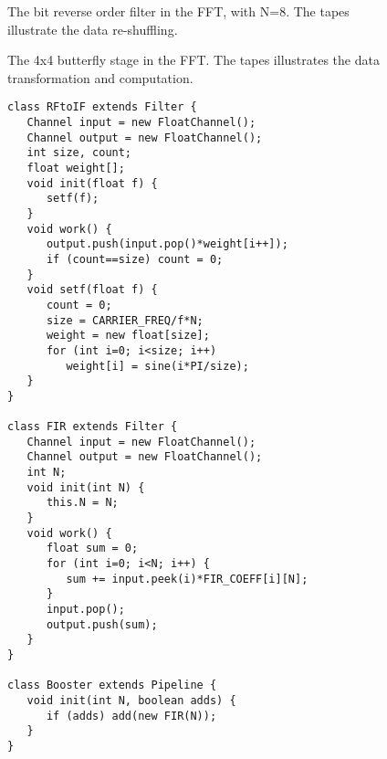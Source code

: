 \begin{figure*}
\centering
{}
\caption{The bit reverse order filter in the FFT, with N=8. The tapes illustrate the data re-shuffling.}
\label{fig:bitreverseorder}
\end{figure*}

\begin{figure*}
\centering
{}
\caption{The 4x4 butterfly stage in the FFT. The tapes illustrates the data transformation and computation.}
\label{fig:butterfly}
\end{figure*}

\begin{figure}
\vspace{-0.4in}
\scriptsize
\begin{verbatim}
class RFtoIF extends Filter {
   Channel input = new FloatChannel();
   Channel output = new FloatChannel();
   int size, count;
   float weight[];
   void init(float f) {
      setf(f);
   }
   void work() {
      output.push(input.pop()*weight[i++]);
      if (count==size) count = 0;
   }
   void setf(float f) {
      count = 0;
      size = CARRIER_FREQ/f*N;
      weight = new float[size];
      for (int i=0; i<size; i++)
         weight[i] = sine(i*PI/size);
   }
}

class FIR extends Filter {
   Channel input = new FloatChannel();
   Channel output = new FloatChannel();           
   int N;
   void init(int N) {
      this.N = N;
   }
   void work() {
      float sum = 0;
      for (int i=0; i<N; i++) {
         sum += input.peek(i)*FIR_COEFF[i][N];
      }
      input.pop();
      output.push(sum);
   }
}

class Booster extends Pipeline {
   void init(int N, boolean adds) {
      if (adds) add(new FIR(N));
   }
}


\end{verbatim}
\end{figure}
